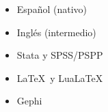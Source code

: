 




\twocolumnsection
{
\begin{itemize}
\vspace{1em}
	\item Español (nativo)
	\item Inglés (intermedio)
\end{itemize}}
{
\vspace{1em}
\begin{itemize}
	\item Stata y SPSS/PSPP
	\item \LaTeX\ y Lua\LaTeX\
    \item Gephi
\end{itemize}
}
\\